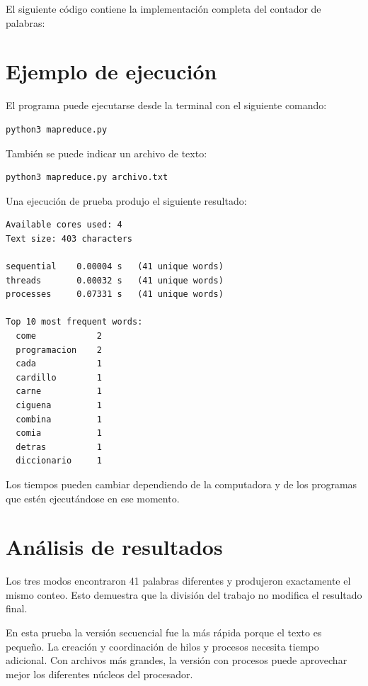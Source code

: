 El siguiente código contiene la implementación completa del contador de
palabras:



\section{Ejemplo de ejecución}

El programa puede ejecutarse desde la terminal con el siguiente comando:

\begin{verbatim}
python3 mapreduce.py
\end{verbatim}

También se puede indicar un archivo de texto:

\begin{verbatim}
python3 mapreduce.py archivo.txt
\end{verbatim}

Una ejecución de prueba produjo el siguiente resultado:

\begin{verbatim}
Available cores used: 4
Text size: 403 characters

sequential    0.00004 s   (41 unique words)
threads       0.00032 s   (41 unique words)
processes     0.07331 s   (41 unique words)

Top 10 most frequent words:
  come            2
  programacion    2
  cada            1
  cardillo        1
  carne           1
  ciguena         1
  combina         1
  comia           1
  detras          1
  diccionario     1
\end{verbatim}

Los tiempos pueden cambiar dependiendo de la computadora y de los programas
que estén ejecutándose en ese momento.

\section{Análisis de resultados}

Los tres modos encontraron 41 palabras diferentes y produjeron exactamente
el mismo conteo. Esto demuestra que la división del trabajo no modifica el
resultado final.

En esta prueba la versión secuencial fue la más rápida porque el texto es
pequeño. La creación y coordinación de hilos y procesos necesita tiempo
adicional. Con archivos más grandes, la versión con procesos puede aprovechar
mejor los diferentes núcleos del procesador.

